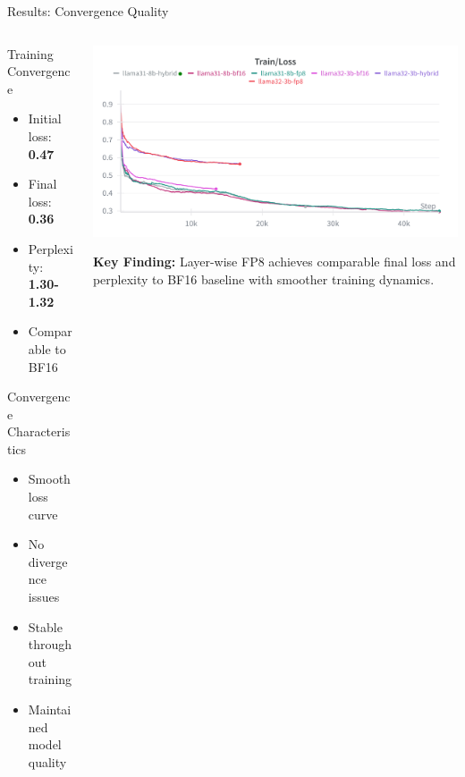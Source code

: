 \begin{frame}{Results: Convergence Quality}

\begin{columns}[c]
\begin{column}{0.48\textwidth}
    \begin{block}{Training Convergence}
    \begin{itemize}
        \item Initial loss: \textbf{0.47}
        \item Final loss: \textbf{0.36}
        \item Perplexity: \textbf{1.30-1.32}
        \item Comparable to BF16
    \end{itemize}
    \end{block}

    \vspace{0.3cm}

    \begin{block}{Convergence Characteristics}
    \begin{itemize}
        \item Smooth loss curve
        \item No divergence issues
        \item Stable throughout training
        \item Maintained model quality
    \end{itemize}
    \end{block}
\end{column}

\begin{column}{0.50\textwidth}
    \centering
    \includegraphics[width=\textwidth]{figures/avg_loss.png}

    \vspace{0.3cm}

    \small
    \textbf{Key Finding:} Layer-wise FP8 achieves comparable final loss and perplexity to BF16 baseline with smoother training dynamics.
\end{column}
\end{columns}

\end{frame}
